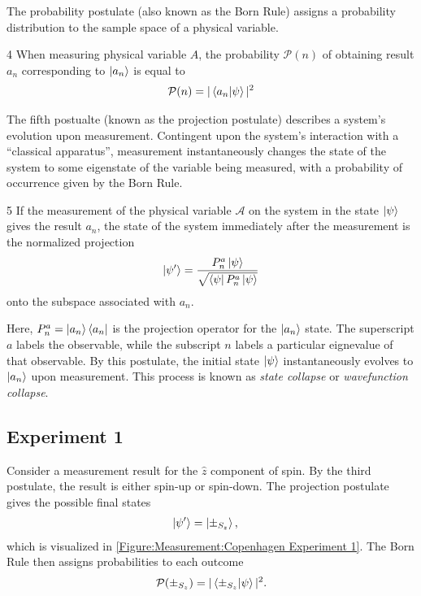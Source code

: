 The probability postulate (also known as the Born Rule) assigns a probability distribution to the sample space of a physical variable.
\begin{Thm:Postulate}{4}
    When measuring physical variable $A$, the probability $\mathcal{P}(n)$ of obtaining result $a_n$ corresponding to $\ket{a_n}$  is equal to
     \begin{align}
        \mathcal{P}(n) = |\braket{a_n|\psi}|^2
    \end{align}
\end{Thm:Postulate}


The fifth postualte (known as the projection postulate) describes a system's evolution upon measurement. Contingent upon the system's interaction with a ``classical apparatus'', measurement instantaneously changes the state of the system to some eigenstate of the variable being measured, with a probability of occurrence given by the Born Rule.

\begin{Thm:Postulate}{5} \label{projection postulate}
    If the measurement of the physical variable $\mathcal{A}$ on the system in the state $\ket{\psi}$ gives the result $a_n$, the state of the system immediately after the measurement is the normalized projection
    \begin{align}
        \ket{\psi^\prime} = \frac{P^a_n\ket{\psi}}{\sqrt{\bra{\psi}P^a_n\ket{\psi}
        }}
    \end{align}
    onto the subspace associated with $a_n$.
\end{Thm:Postulate}
Here, $P^a_n = \ket{a_n}\bra{a_n}$ is the projection operator for the $\ket{a_n}$ state. The superscript $a$ labels the observable, while the subscript $n$ labels a particular eignevalue of that observable. By this postulate, the initial state $\ket{\psi}$ instantaneously evolves to $\ket{a_n}$ upon measurement. This process is known as \textit{state collapse} or \textit{wavefunction collapse}.

\subsection{Experiment 1}\label{Standard Experiment 1}
Consider a measurement result for the $\hat{z}$ component of spin. By the third postulate, the result is either spin-up or spin-down. The projection postulate gives the possible final states
\begin{align}
  \ket{\psi'} &= \ket{\pm_{S_z}},
\end{align}
which is visualized in \autoref{Figure:Measurement:Copenhagen Experiment 1}. The Born Rule then assigns probabilities to each outcome
\begin{align}
  \mathcal{P}(\pm_{S_z}) = |\braket{\pm_{S_z} | \psi}|^2 .
\end{align}

